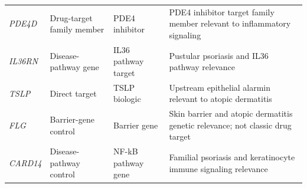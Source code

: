 \documentclass[10pt,a4paper]{article}
\begin{document}
\begin{landscape}
\begin{longtable}{p{2.0cm}p{5.0cm}p{4.2cm}p{12.0cm}}
\textit{PDE4D} & Drug-target family member & PDE4 inhibitor & PDE4 inhibitor target family member relevant to inflammatory signaling \\
\textit{IL36RN} & Disease-pathway gene & IL36 pathway target & Pustular psoriasis and IL36 pathway relevance \\
\textit{TSLP} & Direct target & TSLP biologic & Upstream epithelial alarmin relevant to atopic dermatitis \\
\textit{FLG} & Barrier-gene control & Barrier gene & Skin barrier and atopic dermatitis genetic relevance; not classic drug target \\
\textit{CARD14} & Disease-pathway control & NF-kB pathway gene & Familial psoriasis and keratinocyte immune signaling relevance \\
\end{longtable}
\end{landscape}
\end{document}
